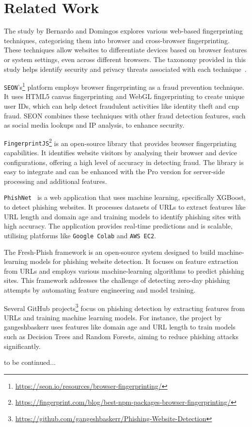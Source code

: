 \section{Related Work} %
\label{sec:related-work}


The study by Bernardo and Domingos explores various web-based fingerprinting techniques, categorising them into browser and cross-browser fingerprinting. These techniques allow websites to differentiate devices based on browser features or system settings, even across different browsers. The taxonomy provided in this study helps identify security and privacy threats associated with each technique~\cite{bernado-domingos:2016}. 

{\texttt{SEON}}'s\footnote{\url{https://seon.io/resources/browser-fingerprinting/}} platform employs browser fingerprinting as a fraud prevention technique. It uses HTML5 canvas fingerprinting and WebGL fingerprinting to create unique user IDs, which can help detect fraudulent activities like identity theft and \gls{cnp} fraud. SEON combines these techniques with other fraud detection features, such as social media lookups and IP analysis, to enhance security.

{\texttt{FingerprintJS}}\footnote{\url{https://fingerprint.com/blog/best-npm-packages-browser-fingerprinting/}} is an open-source library that provides browser fingerprinting capabilities. It identifies website visitors by analysing their browser and device configurations, offering a high level of accuracy in detecting fraud. The library is easy to integrate and can be enhanced with the Pro version for server-side processing and additional features.

{\texttt{PhishNet}}~\cite{kumar-anthony-banga-sohal:2024} is a web application that uses machine learning, specifically XGBoost, to detect phishing websites. It processes datasets of URLs to extract features like URL length and domain age and training models to identify phishing sites with high accuracy. The application provides real-time predictions and is scalable, utilising platforms like {\texttt{Google Colab}} and {\texttt{AWS EC2}}.

The Fresh-Phish framework is an open-source system designed to build machine-learning models for phishing website detection. It focuses on feature extraction from URLs and employs various machine-learning algorithms to predict phishing sites. This framework addresses the challenge of detecting zero-day phishing attempts by automating feature engineering and model training.

Several GitHub projects\footnote{\url{https://github.com/gangeshbaskerr/Phishing-Website-Detection}} focus on phishing detection by extracting features from URLs and training machine learning models. For instance, the project by gangeshbaskerr uses features like domain age and URL length to train models such as Decision Trees and Random Forests, aiming to reduce phishing attacks significantly.

to be continued...

